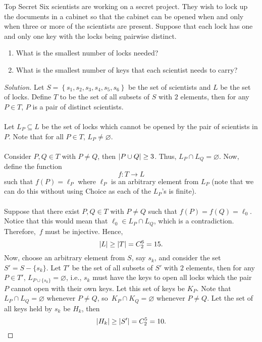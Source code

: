 \documentclass[math]{amznotes}
\theoremstyle{remark}
\newenvironment{solution}
    {\let\oldqedsymbol=\qedsymbol
    \renewcommand{\qedsymbol}{\ }
    \begin{proof}[Solution]
    }
    {\end{proof}
    \renewcommand{\qedsymbol}{\oldqedsymbol}
    }
\begin{document}
\begin{exbox}{Top Secret}{}
    Six scientists are working on a secret project. They wish to lock up the documents in a cabinet so that the cabinet can be opened when and only when three or more of the scientists are present. Suppose that each lock has one and only one key with the locks being pairwise distinct.
    \begin{enumerate}
        \item What is the smallest number of locks needed?
        \item What is the smallest number of keys that each scientist needs to carry?
    \end{enumerate}
    \tcblower   
    \begin{solution}
        Let $S = \left\{s_1, s_2, s_3, s_4, s_5, s_6\right\}$ be the set of scientists and $L$ be the set of locks. Define $T$ to be the set of all subsets of $S$ with $2$ elements, then for any $P \in T$, $P$ is a pair of distinct scientists.
        \\\\
        Let $L_P \subseteq L$ be the set of locks which cannot be opened by the pair of scientists in $P$. Note that for all $P \in T$, $L_P \neq \varnothing$. 
        \\\\
        Consider $P, Q \in T$ with $P \neq Q$, then ${\left\lvert {P \cup Q} \right\rvert} \geq 3$. Thus, $L_P \cap L_Q = \varnothing$. Now, define the function
        \begin{displaymath}
            f \colon T \to L
        \end{displaymath}
        such that $f(P) = \ell_P$ where $\ell_P$ is an arbitrary element from $L_P$ (note that we can do this without using Choice as each of the $L_P$'s is finite).
        \\\\
        Suppose that there exist $P, Q \in T$ with $P \neq Q$ such that $f(P) = f(Q) = \ell_0$. Notice that this would mean that $\ell_0 \in L_P \cap L_Q$, which is a contradiction. Therefore,~$f$ must be injective. Hence, 
        \begin{equation*}
            {\left\lvert {L} \right\rvert} \geq {\left\lvert {T} \right\rvert} = C^6_2 = 15.
        \end{equation*}
        Now, choose an arbitrary element from $S$, say $s_k$, and consider the set $S' = S - \{s_k\}$. Let $T'$ be the set of all subsets of $S'$ with $2$ elements, then for any $P \in T'$, $L_{P \cup \{s_k\}} = \varnothing$, i.e., $s_k$ must have the keys to open all locks which the pair $P$ cannot open with their own keys. Let this set of keys be $K_P$. Note that $L_P \cap L_Q = \varnothing$ whenever $P \neq Q$, so~$K_P \cap K_Q = \varnothing$ whenever $P \neq Q$. Let the set of all keys held by $s_k$ be $H_k$, then
        \begin{equation*}
            {\left\lvert {H_k} \right\rvert} \geq {\left\lvert {S'} \right\rvert} = C^5_2 = 10.
        \end{equation*}
    \end{solution}
\end{exbox}
\end{document}
